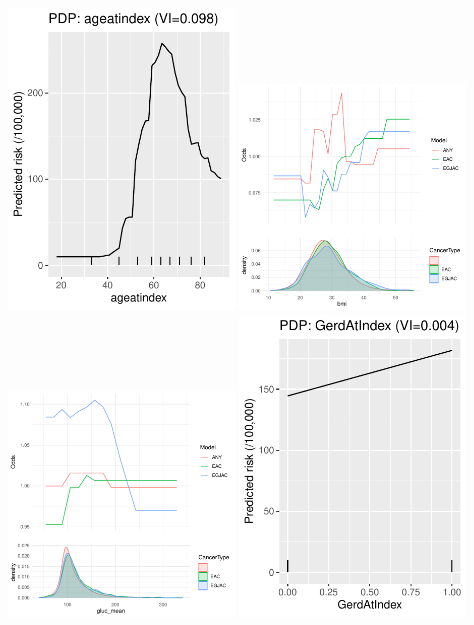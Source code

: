 \documentclass[12pt]{article}
\begin{document}
\begin{center}
\includegraphics[width=0.45\textwidth]{figures/pdp/ageatindex.pdf}
\includegraphics[width=0.45\textwidth]{figures/pdp/bmi.pdf}\\
\includegraphics[width=0.45\textwidth]{figures/pdp/gluc_mean.pdf}
\includegraphics[width=0.45\textwidth]{figures/pdp/GerdAtIndex.pdf}\\
\end{center}
\end{document}
